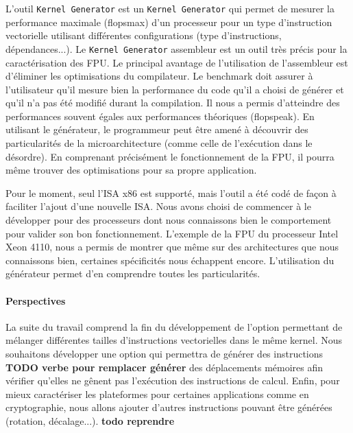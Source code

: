     L'outil \verb=Kernel Generator= est un \verb|Kernel Generator| qui permet de mesurer la performance maximale (\gls{flopsmax})  d'un processeur pour un type d'instruction vectorielle utilisant différentes configurations (type d'instructions, dépendances...).
    Le \verb|Kernel Generator| assembleur est un outil très précis pour la caractérisation des \gls{FPU}. Le principal avantage de l'utilisation de l'assembleur est d'éliminer les optimisations du compilateur. Le benchmark doit assurer à l'utilisateur qu'il mesure bien la performance du code qu'il a choisi de générer et qu'il n'a pas été modifié durant la compilation. Il nous a permis d'atteindre des performances souvent égales aux performances théoriques (\gls{flopspeak}). En utilisant le générateur, le programmeur peut être amené à découvrir des particularités de la microarchitecture (comme celle de l'exécution dans le désordre). En comprenant précisément le fonctionnement de la FPU, il pourra même trouver des optimisations pour sa propre application.
    
    Pour le moment, seul l'ISA x86 est supporté, mais l'outil a été codé de façon à faciliter l'ajout d'une nouvelle ISA. Nous avons choisi de commencer à le développer pour des processeurs dont nous connaissons bien le comportement pour valider son bon fonctionnement. L'exemple de la FPU du processeur Intel Xeon 4110, nous a permis de montrer que même sur des architectures que nous connaissons bien, certaines spécificités nous échappent encore. L'utilisation du générateur permet d'en comprendre toutes les particularités.
    
    
    \paragraph{Perspectives} La suite du travail comprend la fin du développement de l'option permettant de mélanger différentes tailles d'instructions vectorielles dans le même kernel. Nous souhaitons développer une option qui permettra de générer des instructions \textbf{TODO verbe pour remplacer générer} des déplacements mémoires afin vérifier qu'elles ne gênent pas l'exécution des instructions de calcul. Enfin, pour mieux caractériser les plateformes pour certaines applications comme en cryptographie, nous allons ajouter d'autres instructions pouvant être générées (rotation, décalage...). \textbf{todo reprendre}
    
    
